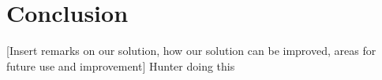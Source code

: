 \section{Conclusion}
\label{sec:conclusion}
[Insert remarks on our solution, how our solution can be improved, areas for future use and improvement]
Hunter doing this


